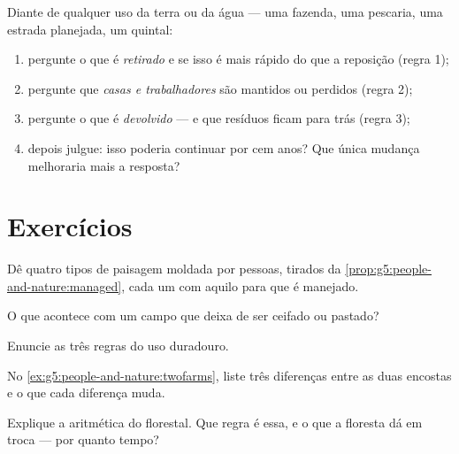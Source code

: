 \begin{method}\label{met:g5:people-and-nature:judge}
Diante de qualquer uso da terra ou da água --- uma fazenda, uma
pescaria, uma estrada planejada, um quintal:
\begin{enumerate}
  \item pergunte o que é \emph{retirado} e se isso é mais rápido do
        que a reposição (regra 1);
  \item pergunte que \emph{casas e trabalhadores} são mantidos ou
        perdidos (regra 2);
  \item pergunte o que é \emph{devolvido} --- e que resíduos ficam
        para trás (regra 3);
  \item depois julgue: isso poderia continuar por cem anos? Que
        única mudança melhoraria mais a resposta?
\end{enumerate}
\end{method}

\section{Exercícios}

\begin{exercise}[$\star$]\label{exo:g5:people-and-nature:1}
Dê quatro tipos de paisagem moldada por pessoas, tirados da
\cref{prop:g5:people-and-nature:managed}, cada um com aquilo para
que é manejado.
\end{exercise}

\begin{exercise}[$\star$]\label{exo:g5:people-and-nature:2}
O que acontece com um campo que deixa de ser ceifado ou pastado?
\end{exercise}

\begin{exercise}[$\star$]\label{exo:g5:people-and-nature:3}
Enuncie as três regras do uso duradouro.
\end{exercise}

\begin{exercise}[$\star$]\label{exo:g5:people-and-nature:4}
No \cref{ex:g5:people-and-nature:twofarms}, liste três diferenças
entre as duas encostas e o que cada diferença muda.
\end{exercise}

\begin{exercise}[$\star$]\label{exo:g5:people-and-nature:5}
Explique a aritmética do florestal. Que regra é essa, e o que a
floresta dá em troca --- por quanto tempo?
\end{exercise}

